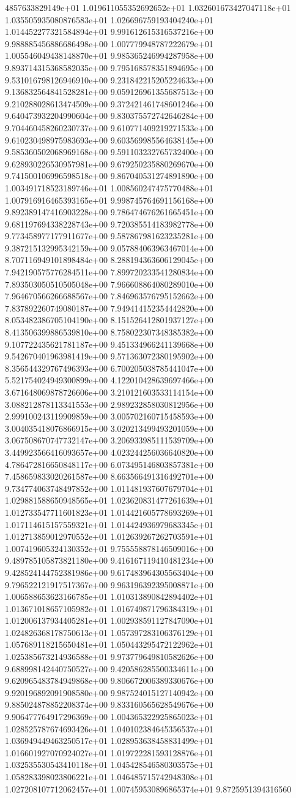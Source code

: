 4857633829149e+01	1.019611055352692652e+01	1.032601673427047118e+01	1.035505935080876583e+01	1.026696759193404240e+01	1.014452277321584894e+01	9.991612615316537216e+00	9.988885456886686498e+00	1.007779948787222679e+01	1.005546049438148870e+01	9.985365246994287958e+00	9.893714315368582035e+00	9.795168578351894695e+00	9.531016798126946910e+00	9.231842215205224633e+00	9.136832564841528281e+00	9.059126961355687513e+00	9.210288028613474509e+00	9.372421461748601246e+00	9.640473932204990604e+00	9.830375572742646284e+00	9.704460458260230737e+00	9.610771409219271533e+00	9.610230498975983693e+00	9.603569985564638145e+00	9.585360502068969168e+00	9.591103232765732400e+00	9.628930226530957981e+00	9.679250235880269670e+00	9.741500106996598518e+00	9.867040531274891890e+00	1.003491718523189746e+01	1.008560247475770488e+01	1.007916916465393165e+01	9.998745764691156168e+00	9.892389147416903228e+00	9.786474676261665451e+00	9.681197694338228743e+00	9.720385514183982778e+00	9.773458977177911677e+00	9.587867981623235281e+00	9.387215132995342159e+00	9.057884063963467014e+00	8.707116949101898484e+00	8.288194363606129045e+00	7.942190575776284511e+00	7.899720233541280834e+00	7.893503050510505048e+00	7.966608864080289010e+00	7.964670566266688567e+00	7.846963576795152662e+00	7.837892260749080187e+00	7.949414152354442820e+00	8.053482386705104190e+00	8.151526412801937127e+00	8.413506399886539810e+00	8.758022307348385382e+00	9.107722435621781187e+00	9.451334966241139668e+00	9.542670401963981419e+00	9.571363072380195902e+00	8.356544329767496393e+00	6.700205038785441047e+00	5.521754024949300899e+00	4.122010428639697466e+00	3.671648069878726606e+00	3.210121603533114154e+00	3.088212878113341553e+00	2.989232858030812956e+00	2.999100243119909859e+00	3.005702160715458593e+00	3.004035418076866915e+00	3.020213499493201059e+00	3.067508670747732147e+00	3.206933985111539709e+00	3.449923566416093657e+00	4.023244256036640820e+00	4.786472816650848117e+00	6.073495146803857381e+00	7.458659833020261587e+00	8.663566491316492701e+00	9.734774063748497852e+00	1.011481937607679704e+01	1.029881588650948565e+01	1.023620831477261639e+01	1.012733547711601823e+01	1.014421605778693269e+01	1.017114615157559321e+01	1.014424936979683345e+01	1.012713859012970552e+01	1.012639267262703591e+01	1.007419605324130352e+01	9.755558878146509016e+00	9.489785105873821180e+00	9.416167119410481234e+00	9.428524144752381986e+00	9.617483964305563404e+00	9.796522121917517367e+00	9.963196392395008871e+00	1.006588653623166785e+01	1.010313890842894402e+01	1.013671018657105982e+01	1.016749871796384319e+01	1.012006137934405281e+01	1.002938591127847090e+01	1.024826368178750613e+01	1.057397283106376129e+01	1.057689118215650481e+01	1.050443295472122962e+01	1.025385673214936588e+01	9.973779649810582626e+00	9.688998142440750527e+00	9.420586285500334611e+00	9.620965483784949868e+00	9.806672006389330676e+00	9.920196892091908580e+00	9.987524015127140942e+00	9.885024878852208374e+00	9.833160565628549676e+00	9.906477764917296369e+00	1.004365322925865023e+01	1.028525787674693426e+01	1.040102384645356537e+01	1.036949449463250517e+01	1.028953638458831499e+01	1.016601927070924027e+01	1.019722281593128876e+01	1.032535530543410118e+01	1.045428546580303575e+01	1.058283398023806221e+01	1.046485715742948308e+01	1.027208107712062457e+01	1.007459530896865374e+01	9.8725951394316560